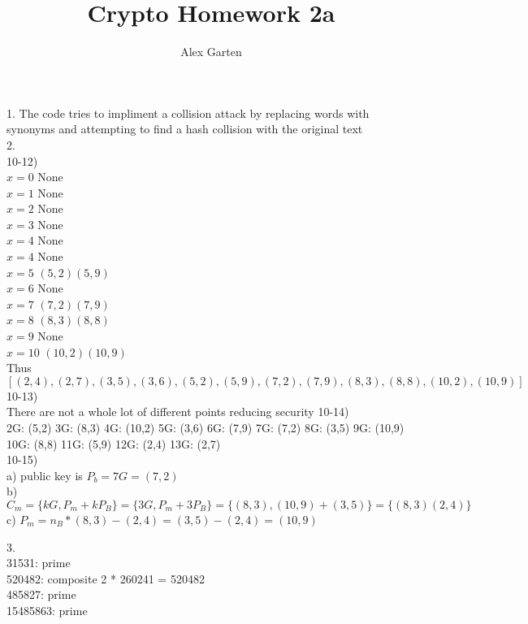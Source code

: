 \documentclass{article}
\begin{document}
\title{Crypto Homework 2a}
\author{Alex Garten}
\date{}

1. The code tries to impliment a collision attack by replacing
words with synonyms and attempting to find a hash collision with
the original text\\

2. \\
10-12) \\
$x=0$ None \\
$x=1$ None \\
$x=2$ None \\
$x=3$ None \\
$x=4$ None \\
$x=4$ None \\
$x=5$ $(5,2) (5,9)$\\
$x=6$ None \\
$x=7$ $(7,2) (7,9)$\\
$x=8$ $(8,3) (8,8)$\\
$x=9$ None \\
$x=10$ $(10,2) (10,9)$\\
Thus $[(2, 4), (2, 7), (3, 5), (3, 6), (5, 2), (5, 9), (7, 2), (7, 9), (8, 3), (8, 8), (10, 2), (10, 9)]$\\
10-13) \\
There are not a whole lot of different points reducing security
10-14) \\
2G: (5,2)
3G: (8,3)
4G: (10,2)
5G: (3,6)
6G: (7,9)
7G: (7,2)
8G: (3,5)
9G: (10,9)
10G: (8,8)
11G: (5,9)
12G: (2,4)
13G: (2,7) \\
10-15) \\
a) public key is $P_b = 7G = (7,2)$ \\
b) $C_m = \{kG, P_m + kP_B\} = \{3G, P_m + 3P_B\} = 
\{(8,3), (10,9) + (3,5)\} = \{(8,3) (2,4)\}$ \\
c) $P_m = n_B*(8,3) - (2,4) = (3,5) - (2,4) = (10,9)$

3. \\
31531: prime \\
520482: composite 2 * 260241 = 520482 \\
485827: prime \\
15485863: prime \\
\end{document}
